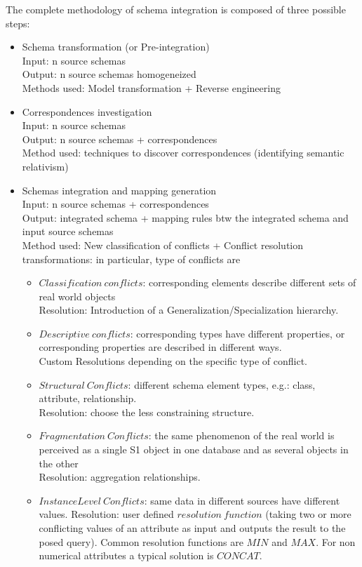 \documentclass[a4page, 11pt]{article}
\begin{document}
The complete methodology of schema integration is composed of three possible steps:
\begin{itemize}

\item Schema transformation (or Pre-integration)\\
Input: n source schemas\\
Output: n source schemas homogeneized\\
Methods used: Model transformation + Reverse engineering
\item Correspondences investigation\\
Input: n source schemas\\
Output: n source schemas + correspondences\\
Method used: techniques to discover correspondences (identifying semantic relativism)
\item Schemas integration and mapping generation\\
Input: n source schemas + correspondences\\
Output: integrated schema + mapping rules btw the integrated schema and input source schemas\\
Method used: New classification of conflicts + Conflict resolution
transformations: in particular, type of conflicts are
\begin{itemize}[noitemsep]
\item $Classification\ conflicts$: corresponding elements describe different sets of real world objects\\
Resolution: Introduction of a Generalization/Specialization hierarchy.
\item $Descriptive\ conflicts$: corresponding types have different properties, or corresponding properties are described in different ways.\\
Custom Resolutions depending on the specific type of conflict. %
\item $Structural\ Conflicts$: different schema element types, e.g.: class, attribute, relationship. \\
Resolution: choose the less constraining structure.
\item $Fragmentation\ Conflicts$: the same phenomenon of the real world is perceived as a single S1 object in one database and as several objects in the other\\
Resolution: aggregation relationships.
\item $Instance Level\ Conflicts$: same data in different sources have different
values.
Resolution: user defined $resolution\ function$ (taking two or more conflicting values of an attribute as input and outputs the result to the posed query). Common resolution functions are $MIN$ and $MAX$. For non numerical attributes a typical solution is $CONCAT$.
\end{itemize}
\end{itemize}
\end{document}
